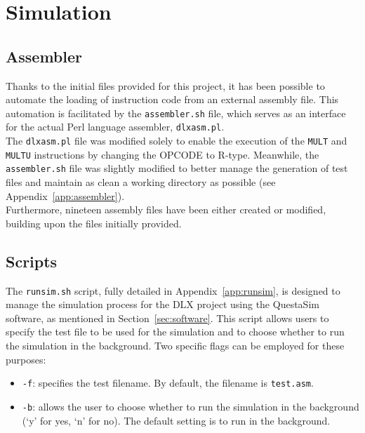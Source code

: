 \chapter{Simulation}
\label{chap:05_simulation}

\section{Assembler}
\label{sec:assembler}

Thanks to the initial files provided for this project, it has been possible to automate the loading of instruction code from an external assembly file. This automation is facilitated by the \texttt{assembler.sh} file, which serves as an interface for the actual Perl language assembler, \texttt{dlxasm.pl}. \\

The \texttt{dlxasm.pl} file was modified solely to enable the execution of the \texttt{MULT} and \texttt{MULTU} instructions by changing the OPCODE to R-type. Meanwhile, the \texttt{assembler.sh} file was slightly modified to better manage the generation of test files and maintain as clean a working directory as possible (see Appendix~\ref{app:assembler}). \\

Furthermore, nineteen assembly files have been either created or modified, building upon the files initially provided.

\section{Scripts}
\label{sec:sim_scripts}

The \texttt{runsim.sh} script, fully detailed in Appendix~\ref{app:runsim}, is designed to manage the simulation process for the DLX project using the QuestaSim software, as mentioned in Section~\ref{sec:software}. This script allows users to specify the test file to be used for the simulation and to choose whether to run the simulation in the background. Two specific flags can be employed for these purposes:

\begin{itemize}
     \item \texttt{-f}: specifies the test filename. By default, the filename is \texttt{test.asm}.
     \item \texttt{-b}: allows the user to choose whether to run the simulation in the background (`y' for yes, `n' for no). The default setting is to run in the background.
\end{itemize}

